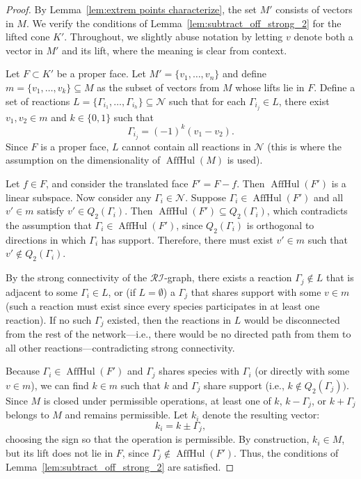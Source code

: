 \documentclass{article}
\begin{document}
\begin{proof}
By Lemma~\ref{lem:extrem points characterize}, the set $M'$ consists of vectors in $M$. We verify the conditions of Lemma~\ref{lem:subtract_off_strong_2} for the lifted cone $K'$. Throughout, we slightly abuse notation by letting $v$ denote both a vector in $M'$ and its lift, where the meaning is clear from context.

Let $F \subset K'$ be a proper face. Let $M' = \{v_1, \dots, v_n\}$ and define $m = \{v_1, \dots, v_k\} \subseteq M$ as the subset of vectors from $M$ whose lifts lie in $F$. Define a set of reactions $L = \{\Gamma_{i_1}, \dots, \Gamma_{i_h}\} \subseteq \mathcal{N}$ such that for each $\Gamma_{i_j} \in L$, there exist $v_1, v_2 \in m$ and $k \in \{0,1\}$ such that
\[
\Gamma_{i_j} = (-1)^k (v_1 - v_2).
\]
Since $F$ is a proper face, $L$ cannot contain all reactions in $\mathcal{N}$ (this is where the assumption on the dimensionality of $\operatorname{AffHul}(M)$ is used).

Let \( f \in F \), and consider the translated face \(F' = F - f \). Then \( \operatorname{AffHul}(F') \) is a linear subspace. Now consider any $\Gamma_i \in \mathcal{N}$. Suppose $\Gamma_i \in \operatorname{AffHul}(F')$ and all $v' \in m$ satisfy $v' \in Q_2(\Gamma_i)$. Then $\operatorname{AffHul}(F') \subseteq Q_2(\Gamma_i)$, which contradicts the assumption that $\Gamma_i \in \operatorname{AffHul}(F')$, since $Q_2(\Gamma_i)$ is orthogonal to directions in which $\Gamma_i$ has support. Therefore, there must exist $v' \in m$ such that $v' \notin Q_2(\Gamma_i)$.

By the strong connectivity of the $\mathcal{RI}$-graph, there exists a reaction $\Gamma_j \notin L$ that is adjacent to some $\Gamma_i \in L$, or (if $L = \emptyset$) a $\Gamma_j$ that shares support with some $v \in m$ (such a reaction must exist since every species participates in at least one reaction). If no such $\Gamma_j$ existed, then the reactions in $L$ would be disconnected from the rest of the network—i.e., there would be no directed path from them to all other reactions—contradicting strong connectivity.

Because $\Gamma_i \in \operatorname{AffHul}(F')$ and $\Gamma_j$ shares species with $\Gamma_i$ (or directly with some $v \in m$), we can find $k \in m$ such that $k$ and $\Gamma_j$ share support (i.e., $k \not\in Q_2(\Gamma_j))$. Since $M$ is closed under permissible operations, at least one of $k$, $k - \Gamma_j$, or $k + \Gamma_j$ belongs to $M$ and remains permissible. Let $k_i$ denote the resulting vector:
\[
k_i = k \pm \Gamma_j,
\]
choosing the sign so that the operation is permissible. By construction, $k_i \in M$, but its lift does not lie in $F$, since $\Gamma_j \notin \operatorname{AffHul}(F')$. Thus, the conditions of Lemma~\ref{lem:subtract_off_strong_2} are satisfied.


\end{proof}
\end{document}

